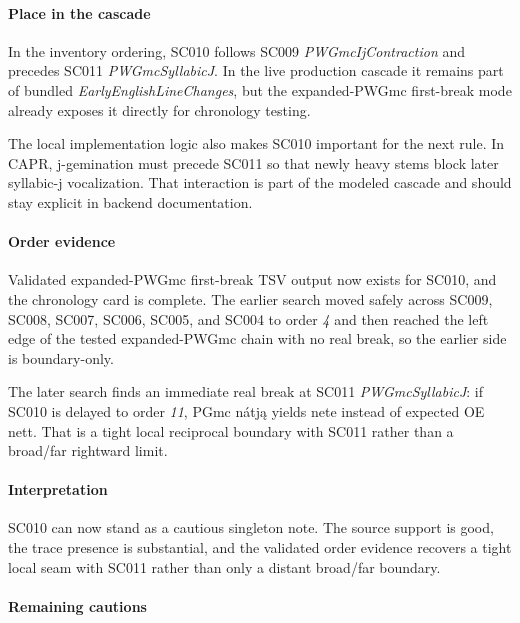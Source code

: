\documentclass[
  british,
  a4paper,
]{article}
\begin{document}
\paragraph{Place in the cascade}\label{place-in-the-cascade-7}

In the inventory ordering, SC010 follows SC009 \emph{PWGmcIjContraction}
and precedes SC011 \emph{PWGmcSyllabicJ}. In the live production cascade
it remains part of bundled \emph{EarlyEnglishLineChanges}, but the
expanded-PWGmc first-break mode already exposes it directly for
chronology testing.

The local implementation logic also makes SC010 important for the next
rule. In CAPR, j-gemination must precede SC011 so that newly heavy stems
block later syllabic-j vocalization. That interaction is part of the
modeled cascade and should stay explicit in backend documentation.

\paragraph{Order evidence}\label{order-evidence-7}

Validated expanded-PWGmc first-break TSV output now exists for SC010,
and the chronology card is complete. The earlier search moved safely
across SC009, SC008, SC007, SC006, SC005, and SC004 to order \emph{4}
and then reached the left edge of the tested expanded-PWGmc chain with
no real break, so the earlier side is boundary-only.

The later search finds an immediate real break at SC011
\emph{PWGmcSyllabicJ}: if SC010 is delayed to order \emph{11}, PGmc
nátją yields nete instead of expected OE nett. That is a tight local
reciprocal boundary with SC011 rather than a broad/far rightward limit.

\paragraph{Interpretation}\label{interpretation-7}

SC010 can now stand as a cautious singleton note. The source support is
good, the trace presence is substantial, and the validated order
evidence recovers a tight local seam with SC011 rather than only a
distant broad/far boundary.

\paragraph{Remaining cautions}\label{remaining-cautions-7}
\end{document}
